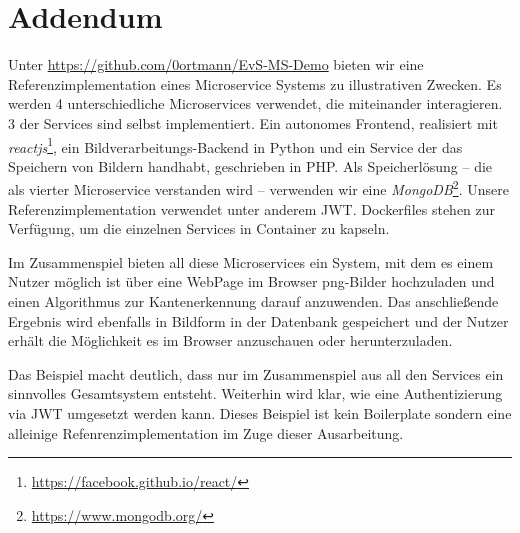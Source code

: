 \section*{Addendum}

Unter \url{https://github.com/0ortmann/EvS-MS-Demo} bieten wir eine Referenzimplementation eines Microservice Systems zu illustrativen Zwecken. Es werden 4 unterschiedliche Microservices verwendet, die miteinander interagieren. 3 der Services sind selbst implementiert. Ein autonomes Frontend, realisiert mit \textit{reactjs}\footnote{\url{https://facebook.github.io/react/}}, ein Bildverarbeitungs-Backend in Python und ein Service der das Speichern von Bildern handhabt, geschrieben in PHP. Als Speicherlösung -- die als vierter Microservice verstanden wird -- verwenden wir eine \textit{MongoDB}\footnote{\url{https://www.mongodb.org/}}. Unsere Referenzimplementation verwendet unter anderem JWT. Dockerfiles stehen zur Verfügung, um die einzelnen Services in Container zu kapseln.

Im Zusammenspiel bieten all diese Microservices ein System, mit dem es einem Nutzer möglich ist über eine WebPage im Browser png-Bilder hochzuladen und einen Algorithmus zur Kantenerkennung darauf anzuwenden. Das anschließende Ergebnis wird ebenfalls in Bildform in der Datenbank gespeichert und der Nutzer erhält die Möglichkeit es im Browser anzuschauen oder herunterzuladen. 

Das Beispiel macht deutlich, dass nur im Zusammenspiel aus all den Services ein sinnvolles Gesamtsystem entsteht. Weiterhin wird klar, wie eine Authentizierung via JWT umgesetzt werden kann. Dieses Beispiel ist kein Boilerplate sondern eine alleinige Refenrenzimplementation im Zuge dieser Ausarbeitung.
